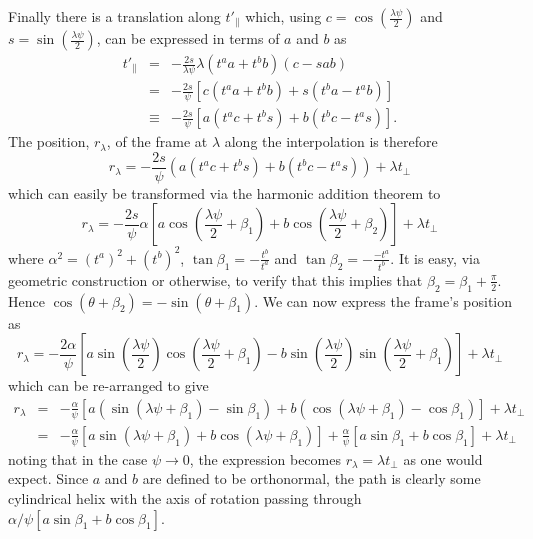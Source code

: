 Finally there is a translation along $t'_\parallel$ which, 
using $c = \cos\left(\frac{\lambda \psi}{2}\right)$ and $s = \sin\left(\frac{\lambda \psi}{2}\right)$,
can be expressed in terms of $a$ and $b$ as
\begin{eqnarray*}
t'_\parallel & = & - \frac{2s}{\lambda\psi} \lambda (t^a a + t^b b) (c - sab) \\
& = & -\frac{2s}{\psi}\left[ c (t^a a + t^b b) + s ( t^b a - t^a b)\right] \\
& \equiv & -\frac{2s}{\psi}\left[ a (t^a c + t^b s) + b ( t^b c - t^a s)\right].
\end{eqnarray*}
The position, $r_\lambda$, of the frame at $\lambda$ along the interpolation is therefore
\[
r_\lambda = -\frac{2s}{\psi} (a (t^a c + t^b s) + b ( t^b c - t^a s)) + \lambda t_\perp
\]
which can easily be transformed via the harmonic addition theorem to
\[
r_\lambda = -\frac{2s}{\psi} \alpha \left[ a \cos\left(\frac{\lambda\psi}{2} + \beta_1\right) + b \cos\left(\frac{\lambda\psi}{2} + \beta_2\right) \right] + \lambda t_\perp
\]
where $\alpha^2 = (t^a)^2 + (t^b)^2$, $\tan \beta_1 = - \frac{t^b}{t^a}$ and $\tan \beta_2 = - \frac{-t^a}{t^b}$. 
It is easy, via geometric construction or otherwise, to verify that this implies
that $\beta_2 = \beta_1 + \frac{\pi}{2}$. Hence $\cos(\theta + \beta_2) = - \sin(\theta + \beta_1)$. We can now express the frame's position as
\[
r_\lambda = -\frac{2\alpha}{\psi} \left[ a \sin\left(\frac{\lambda\psi}{2}\right)\cos\left(\frac{\lambda\psi}{2} + \beta_1\right) - b \sin\left(\frac{\lambda\psi}{2}\right)\sin\left(\frac{\lambda\psi}{2} + \beta_1\right) \right] + \lambda t_\perp
\]
which can be re-arranged to give
\begin{eqnarray*}
r_\lambda & = & -\frac{\alpha}{\psi} \left[ a \left(\sin\left(\lambda\psi + \beta_1\right) - \sin\beta_1\right)
+ b \left(\cos\left(\lambda\psi + \beta_1\right) - \cos\beta_1\right) \right] + \lambda t_\perp \\
& = & -\frac{\alpha}{\psi} \left[ a \sin\left(\lambda\psi + \beta_1\right)
+ b \cos\left(\lambda\psi + \beta_1\right) \right] + \frac{\alpha}{\psi} \left[
a \sin \beta_1 + b \cos \beta_1
\right] + \lambda t_\perp 
\end{eqnarray*}
noting that in the case $\psi \rightarrow 0$, the expression becomes $r_\lambda = \lambda t_\perp$ as one would
expect. Since $a$ and $b$ are defined to be orthonormal, the path is clearly some cylindrical helix with the axis of rotation passing through 
$\alpha/\psi  \left[ a \sin \beta_1 + b \cos \beta_1 \right]$.

